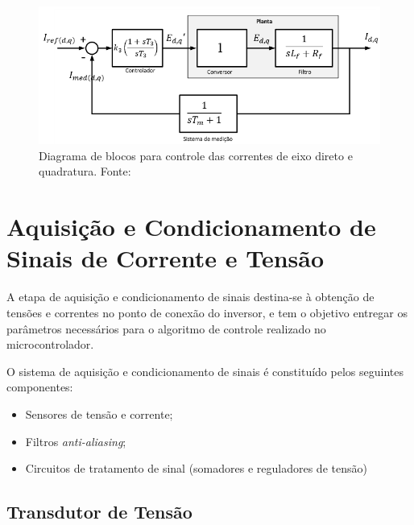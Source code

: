 \begin{figure}[!hbt]
	\begin{center}
		\includegraphics[width=\columnwidth]{figuras/Diagram_Blocos_Eixo_Direto_Quadratura.PNG}
		\caption{Diagrama de blocos para controle das correntes de eixo direto e quadratura. Fonte: \cite{TeseProfAlex}}
		\label{fig:Diagrama_blocos_eixo_dir_quadr}
	\end{center}
\end{figure}


\section{Aquisição e Condicionamento de Sinais de Corrente e Tensão}

A etapa de aquisição e condicionamento de sinais destina-se à obtenção de tensões e correntes no ponto de conexão do inversor, e tem o objetivo entregar os parâmetros necessários para o algoritmo de controle realizado no microcontrolador. 

O sistema de aquisição e condicionamento de sinais é constituído pelos seguintes componentes:

\begin{itemize}
	\item Sensores de tensão e corrente;
	\item Filtros \textit{anti-aliasing};
	\item Circuitos de tratamento de sinal (somadores e reguladores de tensão)
\end{itemize}

\subsection{Transdutor de Tensão}

